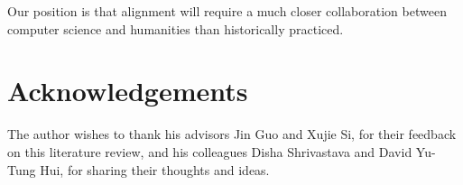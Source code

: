 \documentclass[10pt]{article}
\begin{document}
Our position is that alignment will require a much closer collaboration between computer science and humanities than historically practiced.

\pagebreak \section{Acknowledgements}

The author wishes to thank his advisors Jin Guo and Xujie Si, for their feedback on this literature review, and his colleagues Disha Shrivastava and David Yu-Tung Hui, for sharing their thoughts and ideas.

  
  
\end{document}
